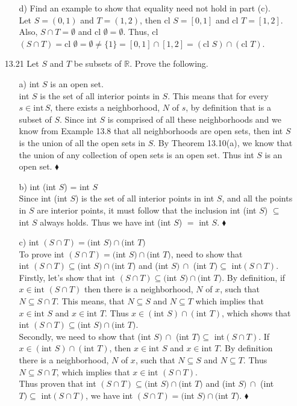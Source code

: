 \documentclass[12pt]{article}
\begin{document}
\begin{enumerate}
\begin{enumerate}
\item[d)] Find an example to show that equality need not hold in part (c). \\
Let $S = (0, 1)$ and $T = (1, 2)$, then cl $S = [0, 1]$ and cl $T = [1, 2]$. 
Also, $S \cap T = \emptyset$ and cl $\emptyset = \emptyset$. Thus,
cl $(S \cap T) = \mbox{cl } \emptyset = \emptyset \neq \{1\} = [0, 1] \cap [1, 2] = (\mbox{cl }S) \cap (\mbox{cl }T)$.
\end{enumerate}

\item[13.21] Let $S$ and $T$ be subsets of $\mathbb{R}$. Prove the following.
\begin{enumerate}
\item[a)] int $S$ is an open set. \\
int $S$ is the set of all interior points in $S$. This means that for every $s \in \mbox{int}\,S$, there exists a neighborhood, $N$ of $s$, by definition that is a subset of $S$. Since int $S$ is comprised of all these neighborhoods and we know from Example 13.8 that all neighborhoods are open sets, then int $S$ is the union of all the open sets in $S$. By Theorem 13.10(a), we know that the union of any collection of open sets is an open set. Thus int $S$ is an open set. $\blacklozenge$

\item[b)] int (int $S$) = int $S$ \\
Since int (int $S$) is the set of all interior points in int $S$, and all the points 
in $S$ are interior points, it must follow that the inclusion int (int $S$) $\subseteq$ int $S$ always holds. Thus we have int (int $S$) $=$ int $S$. $\blacklozenge$

\item[c)] int $(S \cap T) = ($int $S) \cap ($int $T)$ \\
To prove int $(S \cap T) = ($int $S) \cap ($int $T)$, need to show that \\
int $(S \cap T) \subseteq ($int $S) \cap ($int $T)$ and (int $S)\, \cap $ (int $T) \subseteq $ int$(S \cap T)$.
Firstly, let's show that int $(S \cap T) \subseteq ($int $S) \cap ($int $T)$. By definition, if
$x \in \mbox{int }(S \cap T)$ then there is a neighborhood, $N$ of $x$, such that $N \subseteq S \cap T$.
This means, that $N \subseteq S$ and $N \subseteq T$ which implies that $x \in \mbox{int }S$ and 
$x \in \mbox{int }T$. Thus $x \in (\mbox{int } S) \cap (\mbox{int } T)$, which shows that
int $(S \cap T) \subseteq ($int $S) \cap ($int $T)$. \\
Secondly, we need to show that (int $S)\, \cap $ (int $T) \subseteq $ int$(S \cap T)$.
If $x \in (\mbox{int }S) \cap (\mbox{int }T)$, then $x \in \mbox{int }S$ and $x \in \mbox{int }T$.
By definition there is a neighborhood, $N$ of $x$, such that $N \subseteq S$ and $N \subseteq T$.
Thus $N \subseteq S \cap T$, which implies that $x \in \mbox{int }(S \cap T)$. \\
Thus proven that int $(S \cap T) \subseteq ($int $S) \cap ($int $T)$ and 
(int $S)\, \cap $ (int $T) \subseteq $ int$(S \cap T)$, we have 
int $(S \cap T) = ($int $S) \cap ($int $T)$. $\blacklozenge$


\end{enumerate}
\end{enumerate}
\end{document}
